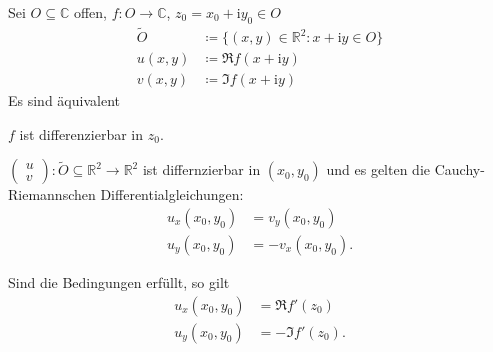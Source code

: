 \documentclass[a4paper,10pt]{scrbook}
\begin{document}
\begin{theorem}[Satz] \label{thm:2.20}
  Sei $O \subseteq \mathbb{C}$ offen, $f : O \to \mathbb{C}$, $z_0 = x_0 + \mathrm{i} y_0 \in O$
  \begin{align*}
    \widetilde{O} &\coloneq \{(x,y) \in \mathbb{R}^2 : x + \mathrm{i} y \in O\} \\
    u(x,y) &\coloneq \Re f(x + \mathrm{i} y) \\
    v(x,y) &\coloneq \Im f(x + \mathrm{i} y)
  \end{align*}
  Es sind äquivalent
  \begin{enum-roman}
    \item \label{itm:2.20 i} $f$ ist differenzierbar in $z_0$.

    \item \label{itm:2.20 ii} $\begin{pmatrix} u \\ v \end{pmatrix} : \widetilde{O} \subseteq \mathbb{R}^2 \to \mathbb{R}^2$ ist differnzierbar in $(x_0,y_0)$ und es gelten die Cauchy-Riemannschen Differentialgleichungen:
    \begin{align*}
      u_x(x_0,y_0) &= v_y(x_0,y_0) \\
      u_y(x_0,y_0) &= -v_x(x_0,y_0) .
    \end{align*}
  \end{enum-roman}
  Sind die Bedingungen erfüllt, so gilt
  \begin{align*}
    u_x(x_0,y_0) &= \Re f'(z_0) \\
    u_y(x_0,y_0) &= - \Im f'(z_0).
  \end{align*}


\end{theorem}
\end{document}
